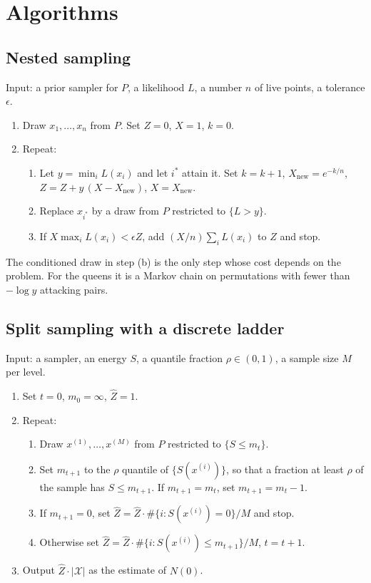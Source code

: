 \documentclass[11pt,twoside,openany]{book}
\theoremstyle{plain}
\theoremstyle{definition}
\theoremstyle{remark}
\newcommand{\cX}{\mathcal{X}}
\begin{document}
\appendix

\chapter{Algorithms}
\label{app:alg}

\section{Nested sampling}

Input: a prior sampler for $P$, a likelihood $L$, a number $n$ of live points, a tolerance $\epsilon$.

\begin{enumerate}
\item Draw $x_1, \dots, x_n$ from $P$. Set $Z = 0$, $X = 1$, $k = 0$.
\item Repeat:
\begin{enumerate}
\item Let $y = \min_i L(x_i)$ and let $i^*$ attain it. Set $k = k + 1$, $X_{\mathrm{new}} = e^{-k/n}$, $Z = Z + y \, (X - X_{\mathrm{new}})$, $X = X_{\mathrm{new}}$.
\item Replace $x_{i^*}$ by a draw from $P$ restricted to $\{ L > y \}$.
\item If $X \max_i L(x_i) < \epsilon Z$, add $(X / n) \sum_i L(x_i)$ to $Z$ and stop.
\end{enumerate}
\end{enumerate}

The conditioned draw in step (b) is the only step whose cost depends on the problem. For the queens it is a Markov chain on permutations with fewer than $-\log y$ attacking pairs.

\section{Split sampling with a discrete ladder}

Input: a sampler, an energy $S$, a quantile fraction $\rho \in (0, 1)$, a sample size $M$ per level.

\begin{enumerate}
\item Set $t = 0$, $m_0 = \infty$, $\hat Z = 1$.
\item Repeat:
\begin{enumerate}
\item Draw $x^{(1)}, \dots, x^{(M)}$ from $P$ restricted to $\{ S \le m_t \}$.
\item Set $m_{t+1}$ to the $\rho$ quantile of $\{ S(x^{(i)}) \}$, so that a fraction at least $\rho$ of the sample has $S \le m_{t+1}$. If $m_{t+1} = m_t$, set $m_{t+1} = m_t - 1$.
\item If $m_{t+1} = 0$, set $\hat Z = \hat Z \cdot \#\{ i : S(x^{(i)}) = 0 \} / M$ and stop.
\item Otherwise set $\hat Z = \hat Z \cdot \#\{ i : S(x^{(i)}) \le m_{t+1} \} / M$, $t = t + 1$.
\end{enumerate}
\item Output $\hat Z \cdot |\cX|$ as the estimate of $N(0)$.
\end{enumerate}
\end{document}
